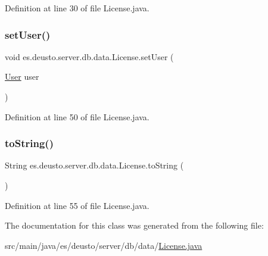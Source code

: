 Definition at line 30 of file License.\+java.

\mbox{\label{classes_1_1deusto_1_1server_1_1db_1_1data_1_1_license_a3ca25ef2a8e0d28af263d67f3d41e893}} 
\subsubsection{\texorpdfstring{set\+User()}{setUser()}}
{\footnotesize\ttfamily void es.\+deusto.\+server.\+db.\+data.\+License.\+set\+User (\begin{DoxyParamCaption}\item[{\hyperlink{classes_1_1deusto_1_1server_1_1db_1_1data_1_1_user}{User}}]{user }\end{DoxyParamCaption})}



Definition at line 50 of file License.\+java.

\mbox{\label{classes_1_1deusto_1_1server_1_1db_1_1data_1_1_license_ae8d930f46f5336bb3478d26ef95c578e}} 
\subsubsection{\texorpdfstring{to\+String()}{toString()}}
{\footnotesize\ttfamily String es.\+deusto.\+server.\+db.\+data.\+License.\+to\+String (\begin{DoxyParamCaption}{ }\end{DoxyParamCaption})}



Definition at line 55 of file License.\+java.



The documentation for this class was generated from the following file\+:\begin{DoxyCompactItemize}
\item 
src/main/java/es/deusto/server/db/data/\hyperlink{_license_8java}{License.\+java}\end{DoxyCompactItemize}
